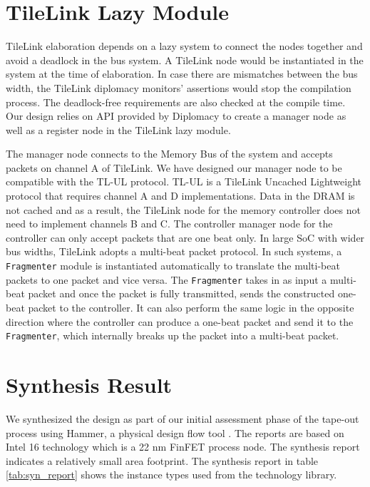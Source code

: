 \section{TileLink Lazy Module}
TileLink elaboration depends on a lazy system to connect the nodes together and avoid a deadlock in the bus system. A TileLink node would be instantiated in the system at the time of elaboration. In case there are mismatches between the bus width, the TileLink diplomacy monitors' assertions would stop the compilation process. The deadlock-free requirements are also checked at the compile time. Our design relies on API provided by Diplomacy to create a manager node as well as a register node in the TileLink lazy module.

The manager node connects to the Memory Bus of the system and accepts packets on channel A of TileLink. We have designed our manager node to be compatible with the TL-UL protocol. TL-UL is a TileLink Uncached Lightweight protocol that requires channel A and D implementations. Data in the DRAM is not cached and as a result, the TileLink node for the memory controller does not need to implement channels B and C. The controller manager node for the controller can only accept packets that are one beat only. In large SoC with wider bus widths, TileLink adopts a multi-beat packet protocol. In such systems, a \verb|Fragmenter| module is instantiated automatically to translate the multi-beat packets to one packet and vice versa. The \verb|Fragmenter| takes in as input a multi-beat packet and once the packet is fully transmitted, sends the constructed one-beat packet to the controller. It can also perform the same logic in the opposite direction where the controller can produce a one-beat packet and send it to the \verb|Fragmenter|, which internally breaks up the packet into a multi-beat packet.

\section{Synthesis Result}
We synthesized the design as part of our initial assessment phase of the tape-out process using Hammer, a physical design flow tool \cite{10.1145/3489517.3530672}. The reports are based on Intel 16 technology which is a 22 nm FinFET process node. The synthesis report indicates a relatively small area footprint. The synthesis report in table \ref{tab:syn_report} shows the instance types used from the technology library.

